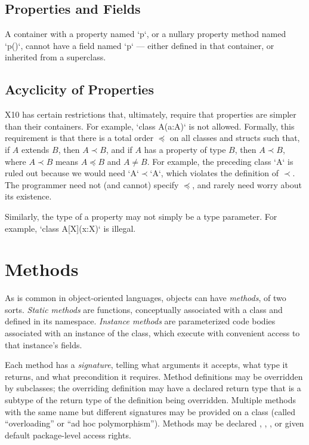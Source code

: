 \subsection{Properties and Fields}

A container with a property named \xcd`p`, or a nullary property method named
\xcd`p()`, cannot have a field named \xcd`p` --- either defined in that
container, or inherited from a superclass.

\subsection{Acyclicity of Properties}

X10 has certain restrictions that, ultimately, require that properties are
simpler than their containers.  For example, \xcd`class A(a:A){}` is not
allowed.  
Formally, this requirement is that there is  a total order $\preceq$ 
on all classes and
structs such that, if $A$ extends $B$, then $A \prec B$, and
if $A$ has a property of type $B$, then $A \prec B$, where $A \prec B$ means
$A \preceq B$ and $A \ne B$.   
For example, the preceding class \xcd`A` is ruled out because we would need
\xcd`A`$\prec$\xcd`A`, which violates the definition of $\prec$.
The programmer need not (and cannot) specify
$\preceq$, and rarely need worry about its existence.  

Similarly, 
the type of a property may not simply be a type parameter.  
For example, \xcd`class A[X](x:X){}` is illegal.





\section{Methods}

As is common in object-oriented languages, objects can have {\em methods}, of
two sorts.  {\em Static methods} are functions, conceptually associated with a
class and defined in its namespace.  {\em Instance methods} are parameterized
code bodies associated with an instance of the class, which execute with
convenient access to that instance's fields. 

Each method has a {\em signature}, telling what arguments it accepts, what
type it returns, and what precondition it requires. Method definitions may be
overridden by subclasses; the overriding definition may have a declared return
type that is a subtype of the return type of the definition being overridden.
Multiple methods with the same name but different signatures may be provided
on a class (called ``overloading'' or ``ad hoc polymorphism''). Methods may be
declared , , , or given default package-level access
rights.

